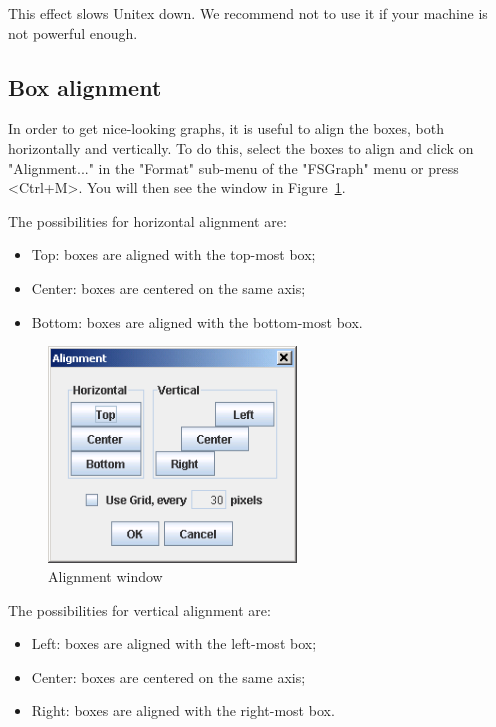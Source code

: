 \noindent This effect slows Unitex down. We recommend  not to use it if your
machine is not powerful enough.

\clearpage 
\subsection{Box alignment}

In order to get nice-looking graphs, it is useful to align the boxes, both
horizontally and  vertically. To do this, select the boxes to align and click on
"Alignment..." in the "Format" sub-menu of the "FSGraph" menu or press <Ctrl+M>.
You will then see the window in Figure~\ref{fig-alignment-frame}.

\bigskip
\noindent The possibilities for horizontal alignment are:
\begin{itemize}
  \item Top: boxes are aligned with  the top-most box;
  \item Center: boxes are centered on the same axis;
  \item Bottom: boxes are aligned with the bottom-most box.
\end{itemize}

\begin{figure}[!h]
\begin{center}
\includegraphics[width=6.6cm]{resources/img/fig5-23.png}
\caption{Alignment window\label{fig-alignment-frame}}
\end{center}
\end{figure}

\noindent The possibilities for vertical alignment are:
\begin{itemize}
  \item Left: boxes are aligned with the left-most box;
  \item Center: boxes are centered on the same axis;
  \item Right: boxes are aligned with the right-most box.
\end{itemize}


